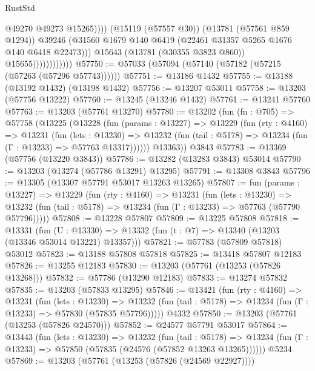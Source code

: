 \begin{lexlean}{RustStd}
\begin{coremodule}
                                      @49270
                                      @49273
                                      @15265))))
                              (@15119 (@57557 @30))
                              (@13781 (@57561 @859 @1294))
                              @39246
                              (@31560
                                @1679
                                @140
                                @6419
                                (@22461 @31357 @5265 @1676 @140 @6418 @22473)))
                            @15643
                            (@13781 (@30355 @3823 @860))
                            @15655))))))))))))
@57750 := @57033 (@57094 (@57140 (@57182 (@57215 (@57263 (@57296 @57743))))))
@57751 := @13186 @1432
@57755 := @13188 (@13192 @1432) (@13198 @1432)
@57756 := @13207 @53011
@57758 := @13203 (@57756 @13222)
@57760 := @13245 (@13246 @1432)
@57761 := @13241 @57760
@57763 := @13203 (@57761 @13270)
@57780 := @13202
    (fun (fn : @705) =>
    @57758
      (@13225
        (@13228
          (fun (params : @13227) =>
          @13229
            (fun (rty : @4160) =>
            @13231
              (fun (lets : @13230) =>
              @13232 (fun (tail : @5178) => @13234 (fun (Γ : @13233) => @57763 @13317))))))
        @13363))
    @3843
@57783 := @13369 (@57756 (@13220 @3843))
@57786 := @13282 (@13283 @3843) @53014
@57790 := @13203 (@13274 (@57786 @13291) @13295)
@57791 := @13308 @3843
@57796 := @13305 (@13307 @57791 @53017 @13263 @13265)
@57807 := fun (params : @13227) =>
  @13229
    (fun (rty : @4160) =>
    @13231
      (fun (lets : @13230) =>
      @13232 (fun (tail : @5178) => @13234 (fun (Γ : @13233) => @57763 (@57790 @57796)))))
@57808 := @13228 @57807
@57809 := @13225 @57808
@57818 := @13331
    (fun (U : @13330) => @13332 (fun (t : @7) => @13340 (@13203 (@13346 @53014 @13221) @13357)))
@57821 := @57783 (@57809 @57818) @53012
@57823 := @13188 @57808 @57818
@57825 := @13418 @57807 @12183
@57826 := @13255 @12183
@57830 := @13203 (@57761 (@13253 (@57826 @13268)))
@57832 := @57786 (@13290 @12183)
@57833 := @13274 @57832
@57835 := @13203 (@57833 @13295)
@57846 := @13421
    (fun (rty : @4160) =>
    @13231
      (fun (lets : @13230) =>
      @13232 (fun (tail : @5178) => @13234 (fun (Γ : @13233) => @57830 (@57835 @57796)))))
    @4332
@57850 := @13203 (@57761 (@13253 (@57826 @24570)))
@57852 := @24577 @57791 @53017
@57864 := @13443
    (fun (lets : @13230) =>
    @13232
      (fun (tail : @5178) =>
      @13234 (fun (Γ : @13233) => @57850 (@57835 (@24576 (@57852 @13263 @13265))))))
    @5234
@57869 := @13203 (@57761 (@13253 (@57826 (@24569 @22927))))

\end{coremodule}
\end{lexlean}
